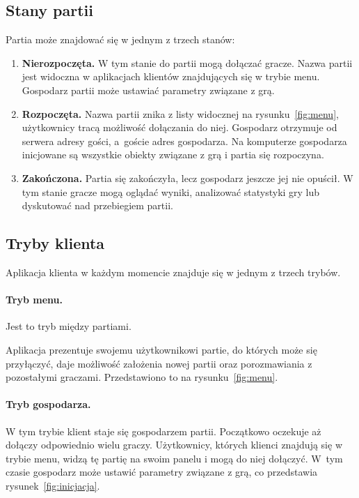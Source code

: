 \documentclass[a4paper, 12pt]{article}
\begin{document}
\subsection{Stany partii}
Partia może znajdować się w jednym z trzech stanów:
\begin{enumerate}
 \item \textbf{Nierozpoczęta.} W tym stanie do partii mogą dołączać gracze. Nazwa partii jest widoczna w aplikacjach klientów znajdujących się w trybie menu. Gospodarz partii może ustawiać parametry związane z grą. 

 \item \textbf{Rozpoczęta.} Nazwa partii znika z listy widocznej na rysunku~\ref{fig:menu}, użytkownicy tracą możliwość dołączania do niej. Gospodarz otrzymuje od serwera adresy gości, a~goście adres gospodarza. Na komputerze gospodarza inicjowane są wszystkie obiekty związane z grą i partia się rozpoczyna.

 \item \textbf{Zakończona.} Partia się zakończyła, lecz gospodarz jeszcze jej nie opuścił. W tym stanie gracze mogą oglądać wyniki, analizować statystyki gry lub dyskutować nad przebiegiem partii.
\end{enumerate}

\subsection{Tryby klienta}
Aplikacja klienta w każdym momencie znajduje się w jednym z trzech trybów.

\paragraph{Tryb menu.} Jest to tryb między partiami.

Aplikacja prezentuje swojemu użytkownikowi partie, do których może się przyłączyć, daje możliwość założenia nowej partii oraz porozmawiania z pozostałymi graczami. Przedstawiono to na rysunku~\ref{fig:menu}. 

\paragraph{Tryb gospodarza.} W tym trybie klient staje się gospodarzem partii. Początkowo oczekuje aż dołączy odpowiednio wielu graczy. Użytkownicy, których klienci znajdują się w trybie menu, widzą tę partię na swoim panelu i mogą do niej dołączyć. W~tym czasie gospodarz może ustawić parametry związane z grą, co przedstawia rysunek~\ref{fig:inicjacja}.
\end{document}
